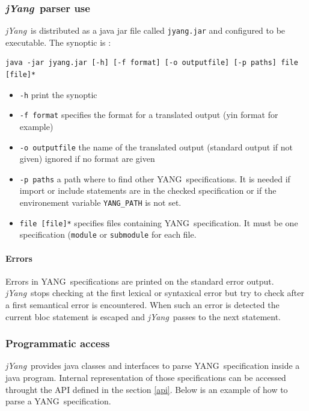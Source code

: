 \documentclass[a4paper]{article}
\newcommand{\jyang}{{\sl jYang}}
\newcommand{\y}{YANG}
\begin{document}
\subsubsection{\jyang\ parser use}

\jyang\ is distributed  as a java jar file  called {\tt jyang.jar} and
configured to be executable. The synoptic is :

\begin{verbatim}
java -jar jyang.jar [-h] [-f format] [-o outputfile] [-p paths] file [file]*
\end{verbatim}

\begin{itemize}
\item
{\tt -h} print the synoptic
\item
{\tt  -f format}  specifies the  format for  a translated  output (yin
format for example)
\item
{\tt -o outputfile} the name of the translated output (standard output
if not given) ignored if no format are given
\item
{\tt -p  paths} a path where  to find other \y\  specifications. It is
needed   if  import  or   include  statements   are  in   the  checked
specification or  if the environement variable {\tt  YANG\_PATH} is not
set.
\item
{\tt file  [file]*} specifies  files containing \y\  specification. It
must be  one specification ({\tt  module} or {\tt submodule}  for each
file.
\end{itemize}

\paragraph{Errors}

Errors  in  \y\  specifications  are  printed on  the  standard  error
output.  \jyang\ stops  checking at  the first  lexical  or syntaxical
error  but   try  to   check  after  a   first  semantical   error  is
encountered. When such an error is detected the current bloc statement
is escaped and \jyang\ passes to the next statement.

\subsubsection{Programmatic access}

\jyang\   provides  java   classes   and  interfaces   to  parse   \y\
specification inside a java  program. Internal representation of those
specifications can be accessed throught the API defined in the section
\ref{api}. Below is an example of how to parse a \y\ specification.
\end{document}
